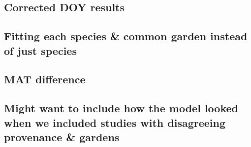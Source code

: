 \documentclass{article}
\begin{document}
\subsection*{Corrected DOY results}
\subsection*{Fitting each species \& common garden instead of just species}
\subsection*{MAT difference}
\subsection*{Might want to include how the model looked when we included studies with disagreeing provenance \& gardens}
\end{document}
